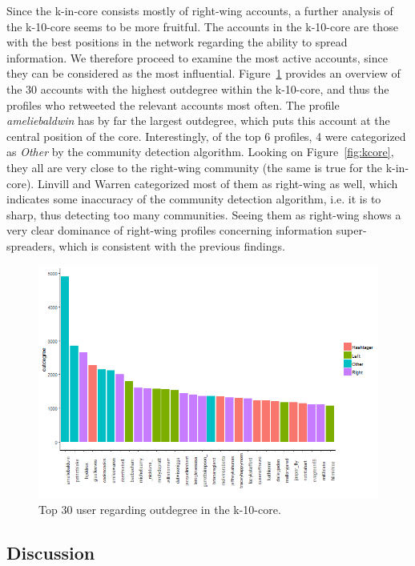 \documentclass[12pt, titlepage=true, toc=bib]{scrartcl}
\begin{document}
Since the k-in-core consists mostly of right-wing accounts, a further analysis of the k-10-core seems to be more fruitful. The accounts in the k-10-core are those with the best positions in the network regarding the ability to spread information. We therefore proceed to examine the most active accounts, since they can be considered as the most influential. Figure~\ref{fig:k10in} provides an overview of the 30 accounts with the highest outdegree within the k-10-core, and thus the profiles who retweeted the relevant accounts most often. The profile \textit{ameliebaldwin} has by far the largest outdegree, which puts this account at the central position of the core. Interestingly, of the top 6 profiles, 4 were categorized as \textit{Other} by the community detection algorithm. Looking on Figure~\ref{fig:kcore}, they all are very close to the right-wing community (the same is true for the k-in-core). Linvill and Warren categorized most of them as right-wing as well, which indicates some inaccuracy of the community detection algorithm, i.e. it is to sharp, thus detecting too many communities. Seeing them as right-wing shows a very clear dominance of right-wing profiles concerning information super-spreaders, which is consistent with the previous findings.

\begin{figure}[!ht]
\centering
\includegraphics[width=0.95\linewidth]{k10_figure}
\caption[Outdegree in the k-core]{Top 30 user regarding outdegree in the k-10-core.}
\label{fig:k10in}
\end{figure}


\subsection{Discussion}
\end{document}

